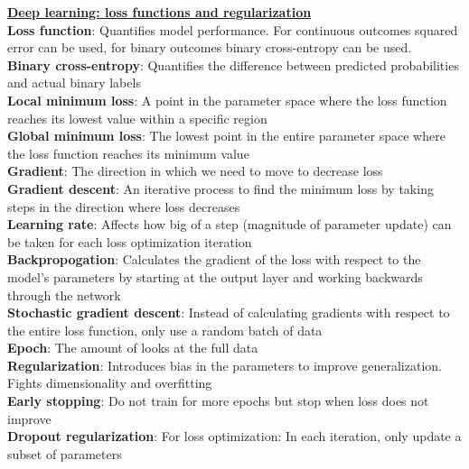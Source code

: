 \documentclass[a4paper,7pt,landscape]{extarticle}
\begin{document}
\begin{multicols}{3}
\begin{boxA}
\underline{\textbf{Deep learning: loss functions and regularization}}\\
\textbf{Loss function}: Quantifies model performance. For continuous outcomes squared error can be used, for binary outcomes binary cross-entropy can be used.\\
\textbf{Binary cross-entropy}: Quantifies the difference between predicted probabilities and actual binary labels\\
\textbf{Local minimum loss}: A point in the parameter space where the loss function reaches its lowest value within a specific region\\
\textbf{Global minimum loss}: The lowest point in the entire parameter space where the loss function reaches its minimum value\\
\textbf{Gradient}: The direction in which we need to move to decrease loss\\
\textbf{Gradient descent}: An iterative process to find the minimum loss by taking steps in the direction where loss decreases\\
\textbf{Learning rate}: Affects how big of a step (magnitude of parameter update) can be taken for each loss optimization iteration\\
\textbf{Backpropogation}: Calculates the gradient of the loss with respect to the model's parameters by starting at the output layer and working backwards through the network\\
\textbf{Stochastic gradient descent}: Instead of calculating gradients with respect to the entire loss function, only use a random batch of data\\
\textbf{Epoch}: The amount of looks at the full data\\
\textbf{Regularization}: Introduces bias in the parameters to improve generalization. Fights dimensionality and overfitting\\
\textbf{Early stopping}: Do not train for more epochs but stop when loss does not improve\\
\textbf{Dropout regularization}: For loss optimization: In each iteration, only update a subset of parameters
\end{boxA}


\end{multicols}
\end{document}
